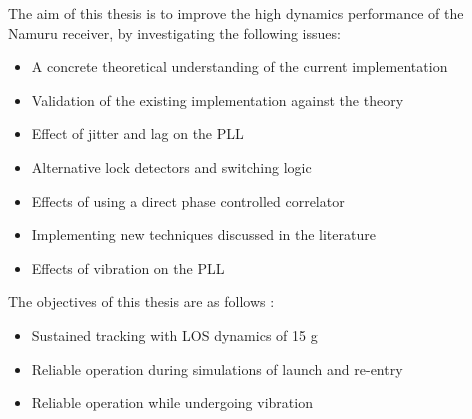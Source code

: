 The aim of this thesis is to improve the high dynamics performance of the Namuru receiver, by investigating the following issues:  

\begin{itemize}
\item{A concrete theoretical understanding of the current implementation}
\item{Validation of the existing implementation against the theory}
\item{Effect of jitter and lag on the \ac{PLL}}
\item{Alternative lock detectors and switching logic}
\item{Effects of using a direct phase controlled correlator}
\item{Implementing new techniques discussed in the literature}
\item{Effects of vibration on the \ac{PLL}}
\end{itemize}

The objectives of this thesis are as follows : 
\begin{itemize}
\item{Sustained tracking with \ac{LOS} dynamics of 15 g}
\item{Reliable operation during simulations of launch and re-entry}
\item{Reliable operation while undergoing vibration}
\end{itemize}
